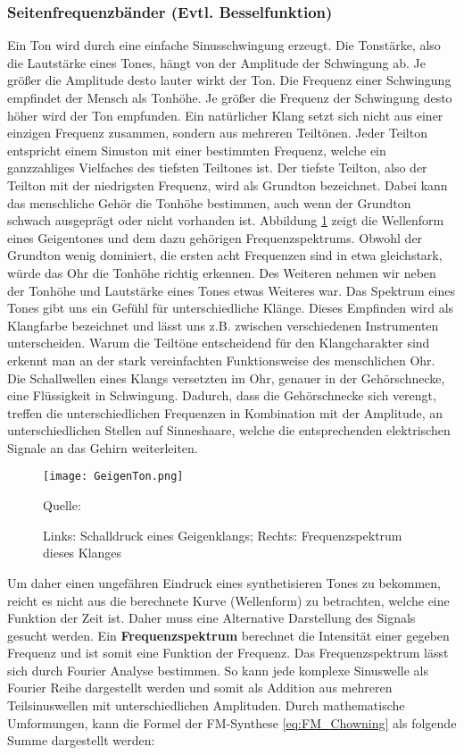 \subsubsection{Seitenfrequenzbänder (Evtl. Besselfunktion)}
Ein Ton wird durch eine einfache Sinusschwingung erzeugt. Die Tonstärke, also die Lautstärke eines Tones, hängt von der Amplitude der Schwingung ab. Je größer die Amplitude desto lauter wirkt der Ton. Die Frequenz einer Schwingung empfindet der Mensch als Tonhöhe. Je größer die Frequenz der Schwingung desto höher wird der Ton empfunden. 
Ein natürlicher Klang setzt sich nicht aus einer einzigen Frequenz zusammen, sondern aus mehreren Teiltönen. Jeder Teilton entspricht einem Sinuston mit einer bestimmten Frequenz, welche ein ganzzahliges Vielfaches des tiefsten Teiltones ist. Der tiefste Teilton, also der Teilton mit der niedrigsten Frequenz, wird als Grundton bezeichnet. \cite[S. 87]{borucki} 
Dabei kann das menschliche Gehör die Tonhöhe bestimmen, auch wenn der Grundton schwach ausgeprägt oder nicht vorhanden ist. \cite[S. 4]{zwicker} Abbildung \ref{fig:geige} zeigt die Wellenform eines Geigentones und dem dazu gehörigen Frequenzspektrums. Obwohl der Grundton wenig dominiert, die ersten acht Frequenzen sind in etwa gleichstark, würde das Ohr die Tonhöhe richtig erkennen. Des Weiteren nehmen wir neben der Tonhöhe und Lautstärke eines Tones etwas Weiteres war. Das Spektrum eines Tones gibt uns ein Gefühl für unterschiedliche Klänge. Dieses Empfinden wird als Klangfarbe bezeichnet und lässt uns z.B. zwischen verschiedenen Instrumenten unterscheiden. \cite[S. 5]{zwicker} \cite[S. 226]{raichel}
Warum die Teiltöne entscheidend für den Klangcharakter sind erkennt man an der stark vereinfachten Funktionsweise des menschlichen Ohr. Die Schallwellen eines Klangs versetzten im Ohr, genauer in der Gehörschnecke, eine Flüssigkeit in Schwingung. Dadurch, dass die Gehörschnecke sich verengt, treffen die unterschiedlichen Frequenzen in Kombination mit der Amplitude, an unterschiedlichen Stellen auf Sinneshaare, welche die entsprechenden elektrischen Signale an das Gehirn weiterleiten. \cite[S. 87 f.]{zwicker}
\begin{figure} [ht]
\centering
  \texttt{[image: GeigenTon.png]}
\caption{Links: Schalldruck eines Geigenklangs; Rechts: Frequenzspektrum dieses Klanges}
\label{fig:geige}
Quelle: \cite[S. 4]{zwicker}
\end{figure}
\FloatBarrier

Um daher einen ungefähren Eindruck eines synthetisieren Tones zu bekommen, reicht es nicht aus die berechnete Kurve (Wellenform) zu betrachten, welche eine Funktion der Zeit ist. Daher muss eine Alternative Darstellung des Signals gesucht werden. Ein \textbf{Frequenzspektrum} berechnet die Intensität einer gegeben Frequenz und ist somit eine Funktion der Frequenz. Das Frequenzspektrum lässt sich durch Fourier Analyse bestimmen. So kann jede komplexe Sinuswelle als Fourier Reihe dargestellt werden und somit als Addition aus mehreren Teilsinuswellen mit unterschiedlichen Amplituden. \cite[S. 33]{raichel} Durch mathematische Umformungen, kann die Formel der FM-Synthese \ref{eq:FM_Chowning} als folgende Summe dargestellt werden: \cite{chowningPaper}

